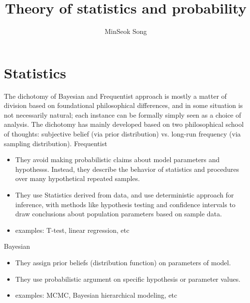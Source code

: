 \documentclass{article}
\title{Theory of statistics and probability}
\author{MinSeok Song}
\date{}
\theoremstyle{remark}
\begin{document}
\maketitle
\section{Statistics}
The dichotomy of Bayesian and Frequentist approach is mostly a matter of division based on foundational philosophical differences, and in some situation is not necessarily natural; each instance can be formally simply seen as a choice of analysis. The dichotomy has mainly developed based on two philosophical school of thoughts:
 subjective belief (via prior distribution) vs. long-run frequency (via sampling distribution).
Frequentist
\begin{itemize}
\item They avoid making probabilistic claims about model parameters and hypothesss. Instead, they describe the behavior of statistics and procedures over many hypothetical repeated samples.
\item They use Statistics derived from data, and use deterministic approach for inference, with methods like hypothesis testing and confidence intervals to draw conclusions about population parameters based on sample data.
\item examples: T-test, linear regression, etc
\end{itemize}

Bayesian
\begin{itemize}
\item They assign prior beliefs (distribution function) on parameters of model.
\item They use probabilistic argument on specific hypothesis or parameter values.
\item examples: MCMC, Bayesian hierarchical modeling, etc
\end{itemize}
\end{document}
